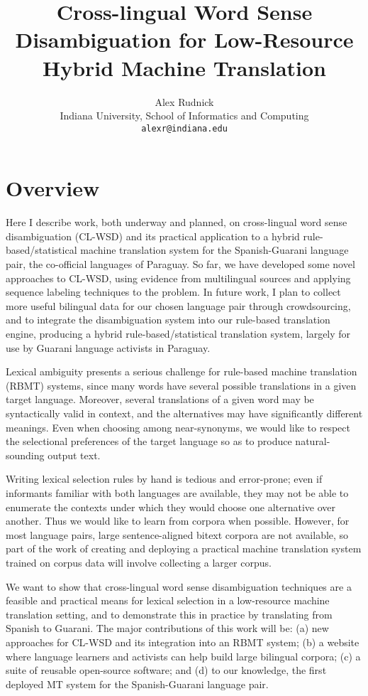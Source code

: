 \documentclass{article}
\title{Cross-lingual Word Sense Disambiguation for Low-Resource Hybrid Machine
Translation}
\author{Alex Rudnick \\
	    Indiana University, School of Informatics and Computing \\
	    {\tt alexr@indiana.edu}}
\date{}
\begin{document}
\maketitle

\section{Overview}
Here I describe work, both underway and planned, on cross-lingual word sense
disambiguation (CL-WSD) and its practical application to a hybrid
rule-based/statistical machine translation system for the Spanish-Guarani
language pair, the co-official languages of Paraguay.  So far, we have
developed some novel approaches to CL-WSD, using evidence from multilingual
sources and applying sequence labeling techniques to the problem.  In future
work, I plan to collect more useful bilingual data for our chosen language pair
through crowdsourcing, and to integrate the disambiguation system into our
rule-based translation engine, producing a hybrid rule-based/statistical
translation system, largely for use by Guarani language activists in Paraguay.

Lexical ambiguity presents a serious challenge for rule-based machine
translation (RBMT) systems, since many words have several possible translations
in a given target language. Moreover, several translations of a given word may
be syntactically valid in context, and the alternatives may have significantly
different meanings. Even when choosing among near-synonyms, we would like to
respect the selectional preferences of the target language so as to produce
natural-sounding output text.

Writing lexical selection rules by hand is tedious and error-prone; even if
informants familiar with both languages are available, they may not be able to
enumerate the contexts under which they would choose one alternative over
another. Thus we would like to learn from corpora when possible. However, for
most language pairs, large sentence-aligned bitext corpora are not available,
so part of the work of creating and deploying a practical machine translation
system trained on corpus data will involve collecting a larger corpus.

We want to show that cross-lingual word sense disambiguation techniques are a
feasible and practical means for lexical selection in a low-resource machine
translation setting, and to demonstrate this in practice by translating from
Spanish to Guarani. The major contributions of this work will be: (a) new
approaches for CL-WSD and its integration into an RBMT system; (b) a website
where language learners and activists can help build large bilingual corpora;
(c) a suite of reusable open-source software; and (d) to our knowledge, the
first deployed MT system for the Spanish-Guarani language pair.
\end{document}

